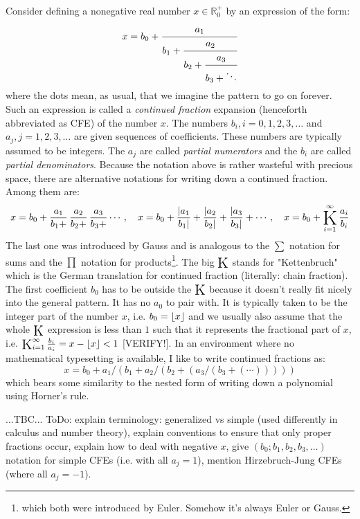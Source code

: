 Consider defining a nonegative real number $x \in \mathbb{R}_0^+$ by an expression of the form:
\begin{equation}
\label{Eq:ContinuedFraction}
x = b_0 + \cfrac{a_1}{b_1 + \cfrac{a_2}{b_2 + \cfrac{a_3}{b_3 + \ddots }}}
\end{equation}
where the dots mean, as usual, that we imagine the pattern to go on forever. Such an expression is called a \emph{continued fraction} expansion (henceforth abbreviated as CFE) of the number $x$. The numbers $b_i, i = 0,1,2,3,\ldots$ and $a_j, j = 1,2,3,\ldots$ are given sequences of coefficients. These numbers are typically assumed to be integers. The $a_j$ are called \emph{partial numerators} and the $b_i$ are called \emph{partial denominators}. Because the notation above is rather wasteful with precious space, there are alternative notations for writing down a continued fraction. Among them are:
\begin{equation}
x = b_0 + \frac{a_1}{b_1 +} \, \frac{a_2}{b_2 +} \, \frac{a_3}{b_3 +} \cdots, \quad
x = b_0 + \frac{|a_1}{b_1|} + \frac{|a_2}{b_2|} + \frac{|a_3}{b_3|} + \cdots, \quad
x = b_0 + \opK_{i=1}^{\infty} \frac{a_i}{b_i}
\end{equation}
The last one was introduced by Gauss and is analogous to the $\sum$ notation for sums and the $\prod$ notation for products\footnote{which both were introduced by Euler. Somehow it's always Euler or Gauss.}. The big $\opK$ stands for "Kettenbruch" which is the German translation for continued fraction (literally: chain fraction). The first coefficient $b_0$ has to be outside the $\opK$ because it doesn't really fit nicely into the general pattern. It has no $a_0$ to pair with. It is typically taken to be the integer part of the number $x$, i.e. $b_0 =\lfloor x\rfloor$ and we usually also assume that the whole $\opK$ expression is less than $1$ such that it represents the fractional part of $x$, i.e. $\opK_{i=1}^{\infty} \frac{b_i}{a_i} = x - \floor{x} < 1$ [VERIFY!]. In an environment where no mathematical typesetting is available, I like to write continued fractions as:
\begin{equation}
x = b_0 + a_1 / (b_1 + a_2 / (b_2 + (a_3 /  (b_3 + (\cdots))))) 
\end{equation}
which bears some similarity to the nested form of writing down a polynomial using Horner's rule. 

...TBC... ToDo: explain terminology: generalized vs simple (used differently in calculus and number theory), explain conventions to ensure that only proper fractions occur, explain how to deal with negative $x$, give $(b_0;b_1,b_2,b_3,\ldots)$ notation for simple CFEs (i.e. with all $a_j = 1$), mention Hirzebruch-Jung CFEs (where all $a_j = -1$).


